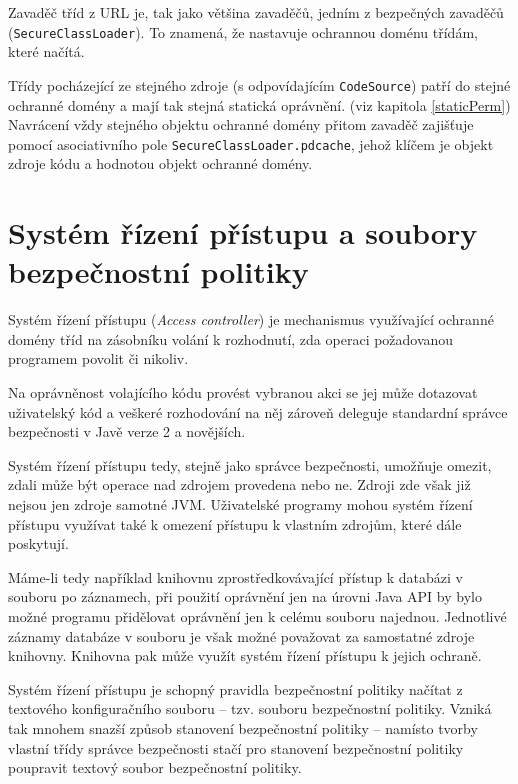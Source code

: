 Zavaděč tříd z URL je, tak jako většina zavaděčů, jedním z bezpečných zavaděčů ({\tt SecureClassLoader}). To znamená, že nastavuje ochrannou doménu třídám, které načítá.

Třídy pocházející ze stejného zdroje (s odpovídajícím {\tt CodeSource}) patří do stejné ochranné domény a mají tak stejná statická oprávnění. (viz kapitola \ref{staticPerm}) Navrácení vždy stejného objektu ochranné domény přitom zavaděč zajišťuje pomocí asociativního pole {\tt SecureClassLoader.pdcache}, jehož klíčem je objekt zdroje kódu a hodnotou objekt ochranné domény. \cite{sourceSecureClassLoader}

\section{Systém řízení přístupu a soubory bezpečnostní politiky}

Systém řízení přístupu ({\it Access controller}) je mechanismus využívající ochranné domény tříd na zásobníku volání k rozhodnutí, zda operaci požadovanou programem povolit či nikoliv.

Na oprávněnost volajícího kódu provést vybranou akci se jej může dotazovat uživatelský kód a veškeré rozhodování na něj zároveň deleguje standardní správce bezpečnosti v Javě verze 2 a novějších. \cite[5]{oaks}

Systém řízení přístupu tedy, stejně jako správce bezpečnosti, umožňuje omezit, zdali může být operace nad zdrojem provedena nebo ne. Zdroji zde však již nejsou jen zdroje samotné JVM. Uživatelské programy mohou systém řízení přístupu využívat také k omezení přístupu k vlastním zdrojům, které dále poskytují. \cite[5]{oaks}

Máme-li tedy například knihovnu zprostředkovávající přístup k databázi v souboru po záznamech, při použití oprávnění jen na úrovni Java API by bylo možné programu přidělovat oprávnění jen k celému souboru najednou. Jednotlivé záznamy databáze v souboru je však možné považovat za samostatné zdroje knihovny. Knihovna pak může využít systém řízení přístupu k jejich ochraně.

Systém řízení přístupu je schopný pravidla bezpečnostní politiky načítat z textového konfiguračního souboru -- tzv. souboru bezpečnostní politiky. Vzniká tak mnohem snazší způsob stanovení bezpečnostní politiky -- namísto tvorby vlastní třídy správce bezpečnosti stačí pro stanovení bezpečnostní politiky poupravit textový soubor bezpečnostní politiky. \cite[5]{oaks}

